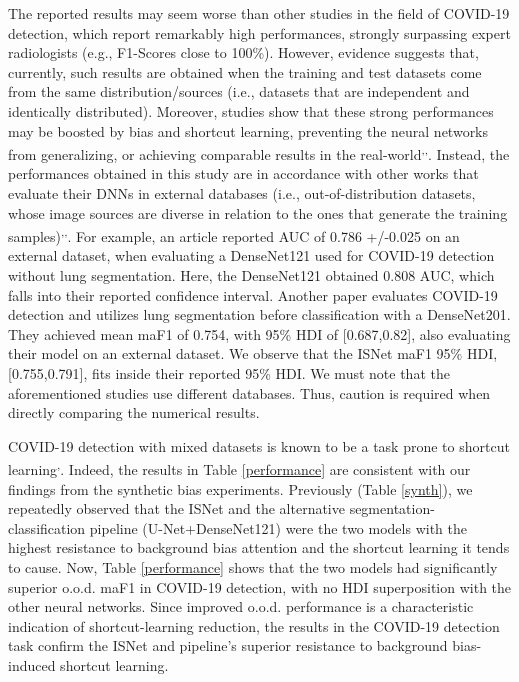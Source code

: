 \documentclass[fleqn,10pt]{wlscirep}
\begin{document}
{The reported results may seem worse than other studies in the field of COVID-19 detection, which report remarkably high performances, strongly surpassing expert radiologists (e.g., F1-Scores close to 100\%). However, evidence suggests that, currently, such results are obtained when the training and test datasets come from the same distribution/sources (i.e., datasets that are independent and identically distributed)\cite{ShortcutCovid}. Moreover, studies show that these strong performances may be boosted by bias and shortcut learning, preventing the neural networks from generalizing, or achieving comparable results in the real-world\cite{ShortcutCovid}\textsuperscript{,}\cite{bassi2021covid19}\textsuperscript{,}\cite{NatureCovidBias}. Instead, the performances obtained in this study are in accordance with other works that evaluate their DNNs in external databases (i.e., out-of-distribution datasets, whose image sources are diverse in relation to the ones that generate the training samples)\cite{ShortcutCovid}\textsuperscript{,}\cite{bassi2021covid19}\textsuperscript{,}\cite{NatureCovidBias}. For example, an article\cite{NatureCovidBias} reported AUC of 0.786 +/-0.025 on an external dataset, when evaluating a DenseNet121 used for COVID-19 detection without lung segmentation. Here, the DenseNet121 obtained 0.808 AUC, which falls into their reported confidence interval. Another paper\cite{bassi2021covid19} evaluates COVID-19 detection and utilizes lung segmentation before classification with a DenseNet201. They achieved mean maF1 of 0.754, with 95\% HDI of [0.687,0.82], also evaluating their model on an external dataset. We observe that the ISNet maF1 95\% HDI, [0.755,0.791], fits inside their reported 95\% HDI. We must note that the aforementioned studies use different databases. Thus, caution is required when directly comparing the numerical results.

COVID-19 detection with mixed datasets is known to be a task prone to shortcut learning\cite{NatureCovidBias}\textsuperscript{,}\cite{ShortcutCovid}. Indeed, the results in Table \ref{performance} are consistent with our findings from the synthetic bias experiments. Previously (Table \ref{synth}), we repeatedly observed that the ISNet and the alternative segmentation-classification pipeline (U-Net+DenseNet121) were the two models with the highest resistance to background bias attention and the shortcut learning it tends to cause. Now, Table \ref{performance} shows that the two models had significantly superior o.o.d. maF1 in COVID-19 detection, with no HDI superposition with the other neural networks. Since improved o.o.d. performance is a characteristic indication of shortcut-learning reduction\cite{ShortcutLearning}, the results in the COVID-19 detection task confirm the ISNet and pipeline's superior resistance to background bias-induced shortcut learning.

}
\end{document}
